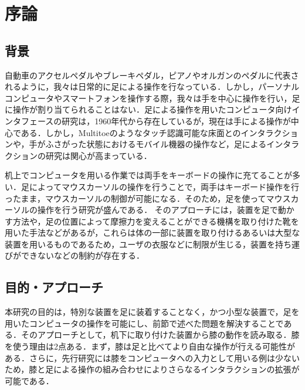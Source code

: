 \chapter{序論}

\section{背景}
自動車のアクセルペダルやブレーキペダル，ピアノやオルガンのペダルに代表されるように，我々は日常的に足による操作を行なっている．しかし，パーソナルコンピュータやスマートフォンを操作する際，我々は手を中心に操作を行い，足に操作が割り当てられることはない．足による操作を用いたコンピュータ向けインタフェースの研究は，1960年代から存在している\cite{1698228}が，現在は手による操作が中心である．しかし，Multitoe\cite{Augsten:2010:MHI:1866029.1866064}のようなタッチ認識可能な床面とのインタラクションや，手がふさがった状態におけるモバイル機器の操作\cite{Fan:2017:ESF:3123021.3123043, okumura_2011}など，足によるインタラクションの研究は関心が高まっている．\par
机上でコンピュータを用いる作業では両手をキーボードの操作に充てることが多い．足によってマウスカーソルの操作を行うことで，両手はキーボード操作を行ったまま，マウスカーソルの制御が可能になる．そのため，足を使ってマウスカーソルの操作を行う研究が盛んである．
%
そのアプローチには，装置を足で動かす方法\cite{Pearson:1986:MMD:22627.22392, Pearson:1988:EET:49108.1046356}や，足の位置によって摩擦力を変えることができる機構を取り付けた靴\cite{Horodniczy:2017:FHE:3025453.3025625}を用いた手法などがあるが，これらは体の一部に装置を取り付けるあるいは大型な装置を用いるものであるため，ユーザの衣服などに制限が生じる，装置を持ち運びができないなどの制約が存在する．



\section{目的・アプローチ}
本研究の目的は，特別な装置を足に装着することなく，かつ小型な装置で，足を用いたコンピュータの操作を可能にし、前節で述べた問題を解決することである．そのアプローチとして，机下に取り付けた装置から膝の動作を読み取る．膝を使う理由は2点ある．まず，膝は足と比べてより自由な操作が行える可能性がある．さらに，先行研究には膝をコンピュータへの入力として用いる例は少ない\cite{1698228}ため，膝と足による操作の組み合わせによりさらなるインタラクションの拡張が可能である．

